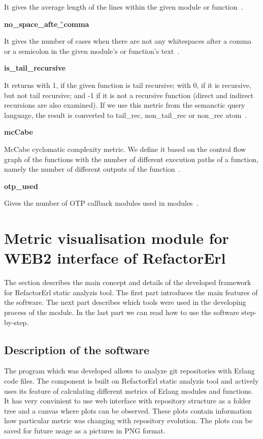 It gives the average length of the lines within the given module or function~\cite{refactorerlm}.

\textbf{no\_space\_afte\r\_comma}

It gives the number of cases when there are not any whitespaces after a comma or a semicolon in the given module's or function's text~\cite{refactorerlm}.

\textbf{is\_tail\_recursive}

It returns with 1, if the given function is tail recursive; with 0, if it is recursive, but not tail recursive; and -1 if it is not a recursive function (direct and indirect recursions are also examined). If we use this metric from the semanctic query language, the result is converted to tail\_rec, non\_tail\_rec or non\_rec atom~\cite{refactorerlm}.

\textbf{mcCabe}

McCabe cyclomatic complexity metric. We define it based on the control flow graph of the functions with the number of different execution paths of a function, namely the number of different outputs of the function~\cite{refactorerlm}.

\textbf{otp\_used}

Gives the number of OTP callback modules used in modules~\cite{refactorerlm}.

\section{Metric visualisation module for WEB2 interface of RefactorErl}

The section describes the main concept and details of the developed framework for RefactorErl static analyzis tool. The first part introduces the main features of the software. The next part describes which tools were used in the developing process of the module. In the last part we can read how to use the software step-by-step.

\subsection{Description of the software}

The program which was developed allows to analyze git repositories with Erlang code files. The component is built on RefactorErl static analyzis tool and actively uses its feature of calculating different metrics of Erlang modules and functions. It has very convinient to use web interface with repository structure as a folder tree and a canvas where plots can be observed. These plots contain information how particular metric was changing with repository evolution. The plots can be saved for future usage as a pictures in PNG format.

